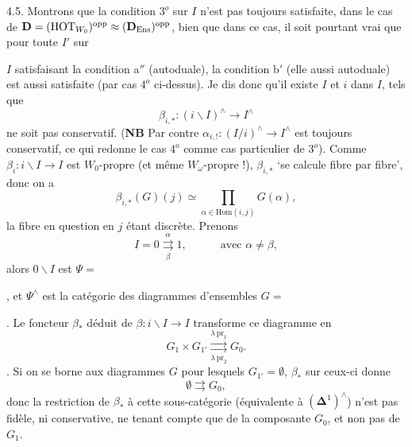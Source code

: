 4.5. Montrons que la condition $3^o$ sur $I$ n'est pas toujours satisfaite, dans le cas de $\mathbf{D} = (\mathrm{HOT}_{W_0})^{\mathrm{opp}} \approx (\mathbf{D}_{\mathrm{Ens}})^{\mathrm{opp}}$, bien que dans ce cas, il soit pourtant vrai que pour toute $I'$ sur


$I$ satisfaisant la condition a$''$ (autoduale), la condition b$'$ (elle aussi autoduale) est aussi satisfaite (par cas $4^o$ ci-dessus). Je dis donc qu'il existe $I$ et $i$ dans $I$, tels que
\[
\beta_{i,*} : (i\backslash I)^\wedge \longrightarrow I^\wedge
\]
ne soit pas conservatif. (\textbf{NB} Par contre $\alpha_{i,!} : (I/i)^\wedge \longrightarrow I^\wedge$ est toujours conservatif, ce qui redonne le cas $4^o$ comme cas particulier de $3^o$). Comme $\beta_i : i\backslash I \longrightarrow I$ est $W_0$-propre (et même $W_\omega$-propre !), $\beta_{i,*}$ `se calcule fibre par fibre', donc on a
\[
\beta_{i,*}(G)(j) \simeq \prod_{\alpha\in\mathrm{Hom}(i,j)} G(\alpha),
\]
la fibre en question en $j$ étant discrète. Prenons
\[
I = 0 \underset{\beta}{\overset{\alpha}{\rightrightarrows}} 1, \qquad\quad \text{avec } \alpha \neq \beta,
\]
alors $0\backslash I$ est $\Psi = {}$, et $\Psi^\wedge$ est la catégorie des diagrammes d'ensembles $G = {}$. Le foncteur $\beta_*$ déduit de $\beta : i\backslash I \longrightarrow I$ transforme ce diagramme en
\[
G_1 \times G_{1'} \underset{\lambda\,\mathrm{pr}_2}{\overset{\lambda\,\mathrm{pr}_1}{\rightrightarrows}} G_0.
\]
. Si on se borne aux diagrammes $G$ pour lesquels $G_{1'} = \emptyset$, $\beta_*$ sur ceux-ci donne
\[
\emptyset \rightrightarrows G_0,
\]
donc la restriction de $\beta_*$ à cette sous-catégorie (équivalente à $(\boldsymbol{\Delta}^1)^\wedge$) n'est pas fidèle, ni conservative, ne tenant compte que de la composante $G_0$, et non pas de $G_1$.

